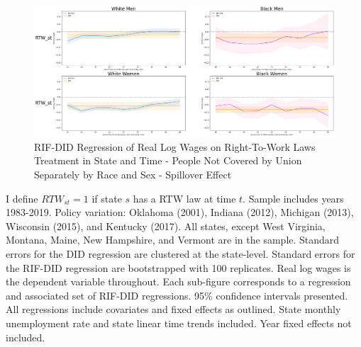 \documentclass[11pt]{article}
\begin{document}
{\pagebreak
\begin{landscape}
\begin{figure}[ht!]
\centering
    \caption{RIF-DID Regression of Real Log Wages on Right-To-Work Laws Treatment in State and Time - People Not Covered by Union Separately by Race and Sex - Spillover Effect}\label{fig:rifdid-sltt-bw-B}
    \includegraphics[width=1.25\textwidth, height = \textheight, keepaspectratio]{figures/fin_rifdid-sltt-bw-B.png}
\end{figure}
\footnotesize{I define $RTW_{st} = 1$ if state $s$ has a RTW law at time $t$. Sample includes years 1983-2019. Policy variation: Oklahoma (2001), Indiana (2012), Michigan (2013), Wisconsin (2015), and Kentucky (2017). All states, except West Virginia, Montana, Maine, New Hampshire, and Vermont are in the sample. Standard errors for the DID regression are clustered at the state-level. Standard errors for the RIF-DID regression are bootstrapped with 100 replicates. Real log wages is the dependent variable throughout. Each sub-figure corresponds to a regression and associated set of RIF-DID regressions. 95\% confidence intervals presented. All regressions include covariates and fixed effects as outlined. State monthly unemployment rate and state linear time trends included. Year fixed effects not included.}
\end{landscape}

}
\end{document}
